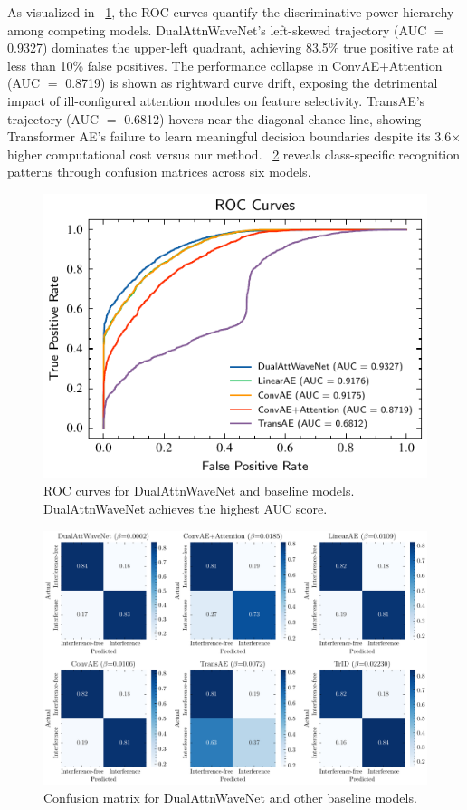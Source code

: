 \documentclass[conference]{IEEEtran}
\begin{document}
As visualized in \figurename~\ref{fig:roc_comparison}, the ROC curves quantify the discriminative power hierarchy among competing models. DualAttnWaveNet's left-skewed trajectory (AUC $=$ 0.9327) dominates the upper-left quadrant, achieving 83.5\% true positive rate at less than 10\% false positives. The performance collapse in ConvAE+Attention (AUC $=$ 0.8719) is shown as rightward curve drift, exposing the detrimental impact of ill-configured attention modules on feature selectivity. TransAE's trajectory (AUC $=$ 0.6812) hovers near the diagonal chance line, showing Transformer AE's failure to learn meaningful decision boundaries despite its 3.6× higher computational cost versus our method. \figurename~\ref{fig:confusion_matrix} reveals class-specific recognition patterns through confusion matrices across six models.

\begin{figure}[t]
    \centering
    \includegraphics[width=0.8\linewidth]{roc-comparison.pdf}
    \caption{ROC curves for DualAttnWaveNet and baseline models. DualAttnWaveNet achieves the highest AUC score.}
    \label{fig:roc_comparison}
\end{figure}

\begin{figure}[tb]
    \centering
    \includegraphics[width=\linewidth]{confusion.pdf}
    \caption{Confusion matrix for DualAttnWaveNet and other baseline models.}
    \label{fig:confusion_matrix}
\end{figure}
\end{document}
